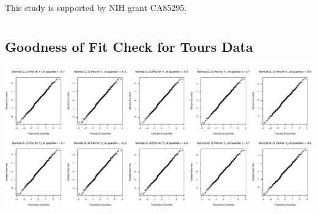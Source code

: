 \documentclass[useAMS,usenatbib,referee]{enar}
\begin{document}
This study is supported by NIH grant CA85295.





\appendix
\section{}

\subsection{Goodness of Fit Check for Tours Data}
\label{sec:goftours}
\includegraphics[scale = .4]{../image/ToursGoF}
\label{lastpage}
\end{document}
